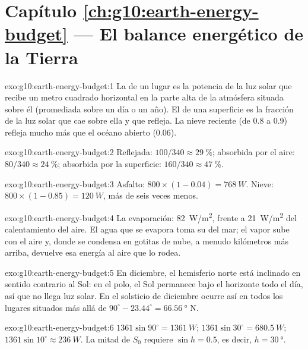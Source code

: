 \section*{Capítulo \ref{ch:g10:earth-energy-budget} --- El balance energético de la Tierra}

\begin{solution}{exo:g10:earth-energy-budget:1}
La  de un lugar es la potencia de la luz solar que recibe un
metro cuadrado horizontal en la parte alta de la atmósfera situada sobre él
(promediada sobre un día o un año). El  de una superficie es la
fracción de la luz solar que cae sobre ella y que refleja. La nieve reciente
(de 0.8 a 0.9) refleja mucho más que el océano abierto (0.06).
\end{solution}

\begin{solution}{exo:g10:earth-energy-budget:2}
Reflejada: $100/340 \approx \qty{29}{\percent}$; absorbida por el aire:
$80/340 \approx \qty{24}{\percent}$; absorbida por la superficie: $160/340
\approx \qty{47}{\percent}$.
\end{solution}

\begin{solution}{exo:g10:earth-energy-budget:3}
Asfalto: $800 \times (1 - 0.04) = \qty{768}{W}$. Nieve: $800 \times (1 -
0.85) = \qty{120}{W}$, más de seis veces menos.
\end{solution}

\begin{solution}{exo:g10:earth-energy-budget:4}
La evaporación: \qty{82}{W/m^2}, frente a \qty{21}{W/m^2} del calentamiento
del aire. El agua que se evapora toma su  del mar; el vapor sube
con el aire y, donde se condensa en gotitas de nube, a menudo kilómetros más
arriba, devuelve esa energía al aire que lo rodea.
\end{solution}

\begin{solution}{exo:g10:earth-energy-budget:5}
En diciembre, el hemisferio norte está inclinado en sentido contrario al
Sol: en el polo, el Sol permanece bajo el horizonte todo el día, así que no
llega luz solar. En el solsticio de diciembre ocurre así en todos los lugares
situados más allá de $90^\circ - 23.44^\circ =
\qty{66.56}{\degree}$ N.
\end{solution}

\begin{solution}{exo:g10:earth-energy-budget:6}
$1361 \sin 90^\circ = \qty{1361}{W}$; $1361 \sin 30^\circ =
\qty{680.5}{W}$; $1361 \sin 10^\circ \approx \qty{236}{W}$. La mitad de $S_0$
requiere $\sin h = 0.5$, es decir, $h = \qty{30}{\degree}$.
\end{solution}

